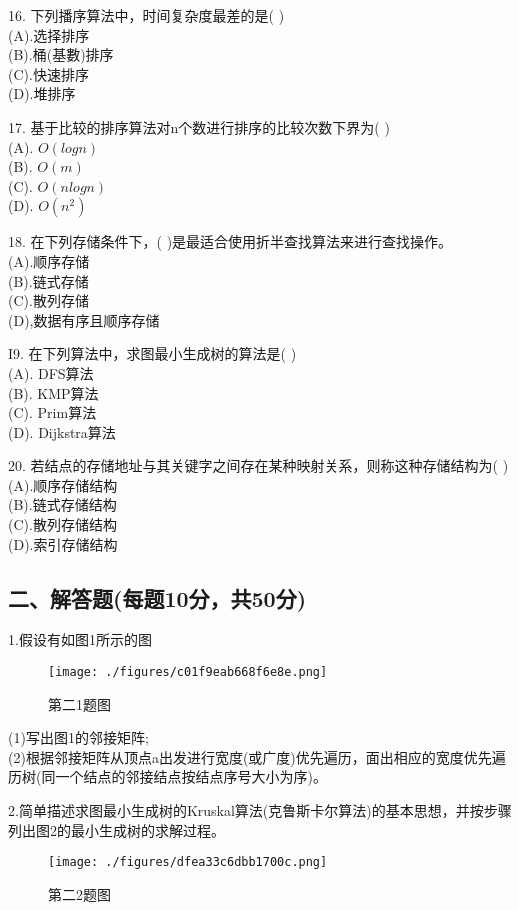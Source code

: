 16. 下列播序算法中，时间复杂度最差的是( ) \\
(A).选择排序 \\
(B).桶(基數)排序 \\
(C).快速排序 \\
(D).堆排序

17. 基于比较的排序算法对n个数进行排序的比较次数下界为( ) \\
(A). $O(logn)$ \\
(B). $O(m)$ \\
(C). $O(nlogn)$ \\
(D). $O(n^2)$

18. 在下列存储条件下，( )是最适合使用折半查找算法来进行查找操作。 \\
(A).顺序存储 \\
(B).链式存储 \\
(C).散列存储 \\
(D),数据有序且顺序存储

I9. 在下列算法中，求图最小生成树的算法是( ) \\
(A). DFS算法 \\
(B). KMP算法 \\
(C). Prim算法 \\
(D). Dijkstra算法

20. 若结点的存储地址与其关键字之间存在某种映射关系，则称这种存储结构为( ) \\
(A).顺序存储结构 \\
(B).链式存储结构 \\
(C).散列存储结构 \\
(D).索引存储结构

\subsection{二、解答题(每题10分，共50分)}

1.假设有如图1所示的图 \\
\begin{figure}[ht]
\centering
\texttt{[image: ./figures/c01f9eab668f6e8e.png]}
\caption{第二1题图} \label{fig_SYDS12_1}
\end{figure}
(1)写出图1的邻接矩阵; \\
(2)根据邻接矩阵从顶点a出发进行宽度(或广度)优先遍历，面出相应的宽度优先遍历树(同一个结点的邻接结点按结点序号大小为序)。


2.简单描述求图最小生成树的Kruskal算法(克鲁斯卡尔算法)的基本思想，并按步骤列出图2的最小生成树的求解过程。
\begin{figure}[ht]
\centering
\texttt{[image: ./figures/dfea33c6dbb1700c.png]}
\caption{第二2题图} \label{fig_SYDS12_2}
\end{figure}

